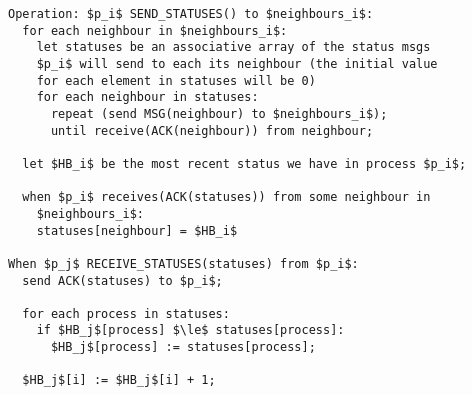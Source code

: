 \documentclass[12pt]{article}
\theoremstyle{plain}
\begin{document}
\begin{lstlisting}[frame=single]
Operation: $p_i$ SEND_STATUSES() to $neighbours_i$:
  for each neighbour in $neighbours_i$:
    let statuses be an associative array of the status msgs
    $p_i$ will send to each its neighbour (the initial value
    for each element in statuses will be 0)
    for each neighbour in statuses:
      repeat (send MSG(neighbour) to $neighbours_i$);
      until receive(ACK(neighbour)) from neighbour;

  let $HB_i$ be the most recent status we have in process $p_i$;

  when $p_i$ receives(ACK(statuses)) from some neighbour in
    $neighbours_i$:
    statuses[neighbour] = $HB_i$

When $p_j$ RECEIVE_STATUSES(statuses) from $p_i$:
  send ACK(statuses) to $p_i$;

  for each process in statuses:
    if $HB_j$[process] $\le$ statuses[process]:
      $HB_j$[process] := statuses[process];

  $HB_j$[i] := $HB_j$[i] + 1;
  
\end{lstlisting}
\end{document}
